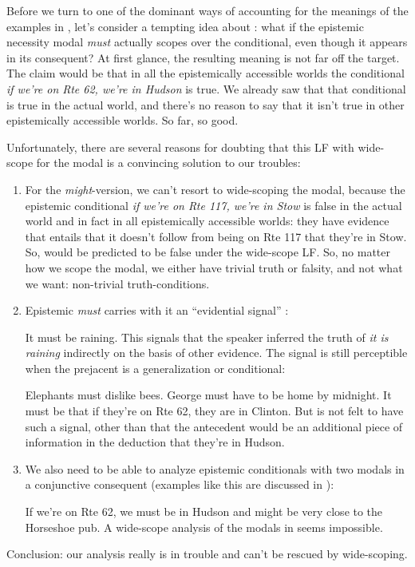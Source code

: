 Before we turn to one of the dominant ways of accounting for the meanings of the
examples in \Last, let's consider a tempting idea about \Last[c]: what if the
epistemic necessity modal \emph{must} actually scopes over the conditional, even
though it appears in its consequent? At first glance, the resulting meaning is
not far off the target. The claim would be that in all the epistemically
accessible worlds the conditional  \emph{if we're on Rte
  62, we're in Hudson} is true. We already saw that that conditional is true in
the actual world, and there's no reason to say that it isn't true in other
epistemically accessible worlds. So far, so good.

Unfortunately, there are several reasons for doubting that this LF with
wide-scope for the modal is a convincing solution to our troubles:

\begin{enumerate}
\item For the \emph{might}-version, we can't resort to wide-scoping the modal,
  because the epistemic conditional \emph{if we're on Rte 117, we're in Stow} is
  false in the actual world and in fact in all epistemically accessible worlds:
  they have evidence that entails that it doesn't follow from being on Rte 117
  that they're in Stow. So, \Last[a] would be predicted to be false under the
  wide-scope LF. So, no matter how we scope the modal, we either have trivial
  truth or falsity, and not what we want: non-trivial truth-conditions.

\item Epistemic \emph{must} carries with it an ``evidential signal''
  \parencite{fintel-gillies-2010-mss}:

  \ex It must be raining. \xe
%
  This signals that the speaker inferred the truth of \emph{it is raining}
  indirectly on the basis of other evidence. The signal is still perceptible
  when the prejacent is a generalization or conditional:

  \pex
  \a Elephants must dislike bees.
  \a George must have to be home by midnight.
  \a It must be that if they're on Rte 62, they are in Clinton.
  \xe
%
  But  is not felt to have such a signal, other than that
  the antecedent would be an additional piece of information in the deduction
  that they're in Hudson.

\item We also need to be able to analyze epistemic conditionals with two modals
  in a conjunctive consequent (examples like this are discussed in
  \cite{gillies-2010-iffiness}):

  \ex\label{ex:two-modals} If we're on Rte 62, we must be in Hudson and might be
  very close to the Horseshoe pub. \xe
%
  A wide-scope analysis of the modals in \Last seems impossible.

\end{enumerate}
%
Conclusion: our analysis really is in trouble and can't be rescued by
wide-scoping.

